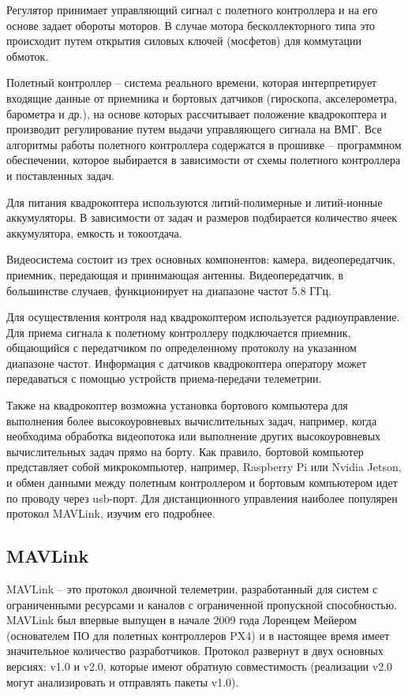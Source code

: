 Регулятор принимает управляющий сигнал с полетного контроллера и на его основе задает обороты моторов. В случае мотора бесколлекторного типа это происходит путем открытия силовых ключей (мосфетов) для коммутации обмоток.

Полетный контроллер -- система реального времени, которая интерпретирует входящие данные от приемника и бортовых датчиков (гироскопа, акселерометра, барометра и др.), на основе которых рассчитывает положение квадрокоптера и производит регулирование путем выдачи управляющего сигнала на ВМГ. Все алгоритмы работы полетного контроллера содержатся в прошивке -- программном обеспечении, которое выбирается в зависимости от схемы полетного контроллера и поставленных задач.

Для питания квадрокоптера используются литий-полимерные и литий-ионные аккумуляторы. В зависимости от задач и размеров подбирается количество ячеек аккумулятора, емкость и токоотдача.

Видеосистема состоит из трех основных компонентов: камера, видеопередатчик, приемник, передающая и принимающая антенны. Видеопередатчик, в большинстве случаев, функционирует на диапазоне частот 5.8 ГГц.

Для осуществления контроля над квадрокоптером используется радиоуправление. Для приема сигнала к полетному контроллеру подключается приемник, общающийся с передатчиком по определенному протоколу на указанном диапазоне частот. Информация с датчиков квадрокоптера оператору может передаваться с помощью устройств приема-передачи телеметрии.

Также на квадрокоптер возможна установка бортового компьютера для выполнения более высокоуровневых вычислительных задач, например, когда необходима обработка видеопотока или выполнение других высокоуровневых вычислительных задач прямо на борту. Как правило, бортовой компьютер представляет собой микрокомпьютер, например, Ras\-pber\-ry Pi или Nvi\-dia Jet\-son, и обмен данными между полетным контроллером и бортовым компьютером идет по проводу через usb-порт. Для дистанционного управления наиболее популярен протокол MAVLink, изучим его подробнее.

\subsection{MAVLink}


MAVLink -- это протокол двоичной телеметрии, разработанный для систем с ограниченными ресурсами и каналов с ограниченной пропускной способностью. MAVLink был впервые выпущен в начале 2009 года Лоренцем Мейером (основателем ПО для полетных контроллеров PX4) и в настоящее время имеет значительное количество разработчиков. Протокол развернут в двух основных версиях: v1.0 и v2.0, которые имеют обратную совместимость (реализации v2.0 могут анализировать и отправлять пакеты v1.0).

